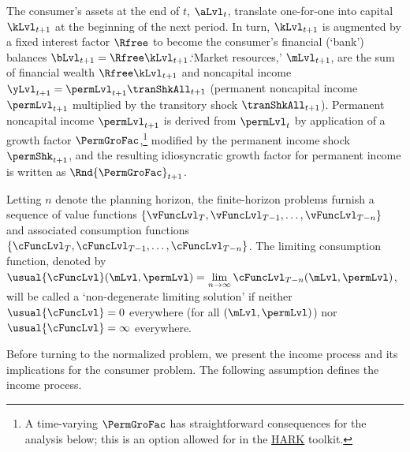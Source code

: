 \documentclass[BufferStockTheory]{subfiles}
\begin{document}

%
The consumer's assets at the end of $t$, $\aLvl_{t}$, translate one-for-one into capital $\kLvl_{t+1}$ at the beginning of the next period.
In turn, $\kLvl_{t+1}$ is augmented by a fixed interest factor $\Rfree$ to become the consumer's financial (`bank') balances $\bLvl_{t+1} = \Rfree \kLvl_{t+1}$.`Market resources,' $\mLvl_{t+1}$,  are the sum of financial wealth $\Rfree \kLvl_{t+1}$ and noncapital income $\yLvl_{t+1}=\permLvl_{t+1}\tranShkAll_{t+1}$ (permanent noncapital income $\permLvl_{t+1}$ multiplied by the transitory shock $\tranShkAll_{t+1}$).
Permanent noncapital income $\permLvl_{t+1}$ is derived from $\permLvl_{t}$ by application of a growth factor $\PermGroFac$,\footnote{A time-varying $\PermGroFac$ has straightforward consequences for the analysis below; this is an option allowed for in the \href{https://econ-ark.org}{HARK} toolkit.} modified by the permanent income shock $\permShk_{t+1}$, and the resulting idiosyncratic growth factor for permanent income is written as $\Rnd{\PermGroFac}_{t+1}$.

Letting $n$ denote the planning horizon, the finite-horizon problems furnish a sequence of value functions $\{\vFuncLvl_{T},\vFuncLvl_{T-1},\ldots,\vFuncLvl_{T-n}\}$ and associated consumption functions $\{\cFuncLvl_{T},\cFuncLvl_{T-1},\ldots,\cFuncLvl_{T-n}\}$.
The limiting consumption function, denoted by $\usual{\cFuncLvl}(\mLvl,\permLvl) = \lim\limits_{n \rightarrow \infty} \cFuncLvl_{T-n}(\mLvl,\permLvl)$, will be called a `non-degenerate limiting solution' if  neither $\usual{\cFuncLvl}=0$ everywhere (for all $(\mLvl,\permLvl)$) nor $\usual{\cFuncLvl}=\infty$ everywhere.

Before turning to the normalized problem, we present the income process and its implications for the consumer problem.
The following assumption defines the income process.
\end{document}
